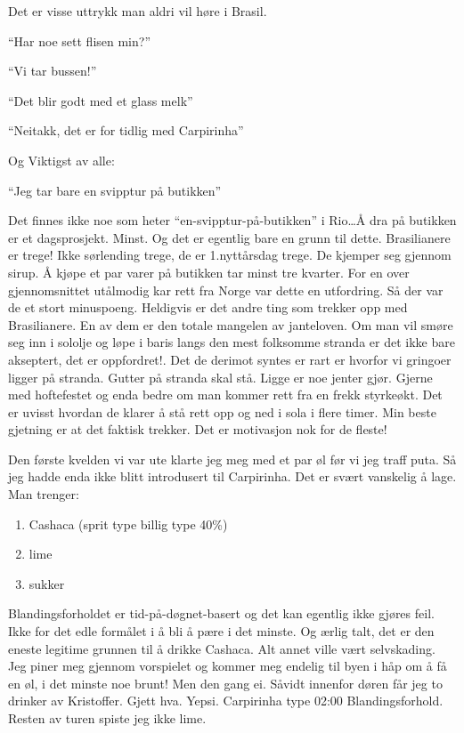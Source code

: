 Det er visse uttrykk man aldri vil høre i Brasil.
\begin{dialogue}
	\item ``Har noe sett flisen min?''\\
	\item ``Vi tar bussen!''\\
	\item ``Det blir godt med et glass melk''\\
	\item ``Neitakk, det er for tidlig med Carpirinha''\\	
\end{dialogue}
Og Viktigst av alle:\\
\begin{dialogue}
	\item ``Jeg tar bare en svipptur på butikken''
\end{dialogue}
Det finnes ikke noe som heter ``en-svipptur-på-butikken'' i Rio\ldots Å dra på butikken er
et dagsprosjekt. Minst.  Og det er egentlig bare en grunn til dette.
Brasilianere er trege! Ikke sørlending trege, de er 1.nyttårsdag
trege. De kjemper seg gjennom sirup. Å kjøpe et par varer på butikken
tar minst tre kvarter. For en over gjennomsnittet utålmodig kar rett
fra Norge var dette en utfordring. Så der var de et stort minuspoeng.
Heldigvis er det andre ting som trekker opp med Brasilianere. En av
dem er den totale mangelen av janteloven. Om man vil smøre seg inn i
sololje og løpe i baris langs den mest folksomme stranda er det ikke
bare akseptert, det er oppfordret!. Det de derimot syntes er rart er
hvorfor vi gringoer ligger på stranda. Gutter på stranda skal stå.
Ligge er noe jenter gjør. Gjerne med hoftefestet og enda bedre om man kommer rett fra en frekk styrkeøkt. Det er uvisst hvordan de klarer å stå rett opp
og ned i sola i flere timer. Min beste gjetning er at det faktisk
trekker. Det er motivasjon nok for de fleste!

Den første kvelden vi var ute klarte jeg meg med et par øl før vi jeg
traff puta. Så jeg hadde enda ikke blitt introdusert til Carpirinha.
Det er svært vanskelig å lage. Man trenger:

\begin{enumerate}
	\item Cashaca (sprit type billig type 40\%)
	\item lime 
	\item sukker
\end{enumerate}

Blandingsforholdet er tid-på-døgnet-basert og det kan egentlig ikke
gjøres feil. Ikke for det edle formålet i å bli å pære i det minste.
Og ærlig talt, det er den eneste legitime grunnen til å drikke
Cashaca. Alt annet ville vært selvskading. Jeg piner meg gjennom
vorspielet og kommer meg endelig til byen i håp om å få en øl, i det
minste noe brunt! Men den gang ei. Såvidt innenfor døren får jeg to
drinker av Kristoffer. Gjett hva. Yepsi. Carpirinha type 02:00
Blandingsforhold. Resten av turen spiste jeg ikke lime.
\clearpage
